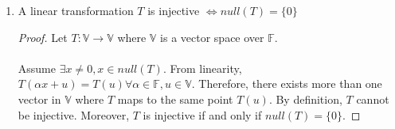 \begin{sol}
\begin{enumerate}[label=\textbf{(\alph*)}]
\begin{proof}
By definition, if a vector space is not finite dimensional, it is infinite dimensional.
\end{proof}
\item
\begin{theorem}
A linear transformation $T$ is injective $\iff null(T)=\{0\}$
\end{theorem}
\begin{proof}
Let $T:\mathbb V\to\mathbb V$ where $\mathbb V$ is a vector space over $\mathbb F$.\\\\
Assume $\exists x\neq 0,x\in null(T)$. From linearity, $T(\alpha x+u)=T(u)\forall\alpha\in\mathbb F, u\in \mathbb V$. Therefore, there exists more than one vector in $\mathbb V$ where $T$ maps to the same point $T(u)$. By definition, $T$ cannot be injective. Moreover, $T$ is injective if and only if $null(T)=\{0\}$.
\end{proof}
\end{enumerate}
\end{sol}
